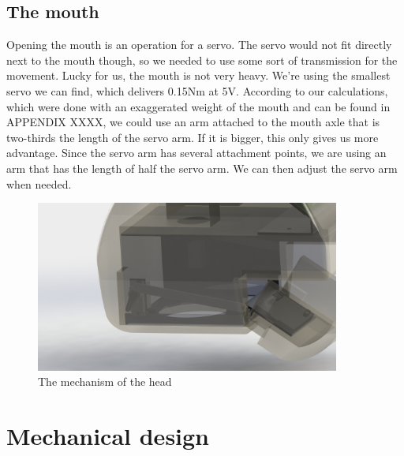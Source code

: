 \documentclass[11pt,twoside,a4paper]{report}
\begin{document}
\subsection{The mouth}
Opening the mouth is an operation for a servo. The servo would not fit directly next to the mouth though, so we needed to use some sort of transmission for the movement.
Lucky for us, the mouth is not very heavy. We\rq{}re using the smallest servo we can find, which delivers 0.15Nm at 5V.
According to our calculations, which were done with an exaggerated weight of the mouth and can be found in APPENDIX XXXX, we could use an arm attached to the mouth axle that is two-thirds the length of the servo arm. If it is bigger, this only gives us more advantage. Since the servo arm has several attachment points, we are using an arm that has the length of half the servo arm. We can then adjust the servo arm when needed.

\begin{figure}[H]
\begin{center}
\includegraphics[width = 10cm]{Images/headmechanism.jpg}
\caption{The mechanism of the head}
\label{fig:headmech}
\end{center}
\end{figure}

\section{Mechanical design}
\end{document}
